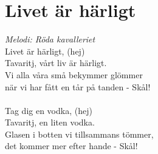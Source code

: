\section{Livet är härligt}
\textit{Melodi: Röda kavalleriet}
\vspace{2mm}\\
Livet är härligt, (hej)\\
Tavaritj, vårt liv är härligt.\\
Vi alla våra små bekymmer glömmer\\
när vi har fått en tår på tanden - Skål!\\
\\
Tag dig en vodka, (hej)\\
Tavaritj, en liten vodka.\\
Glasen i botten vi tillsammans tömmer,\\
det kommer mer efter hande - Skål!\\
